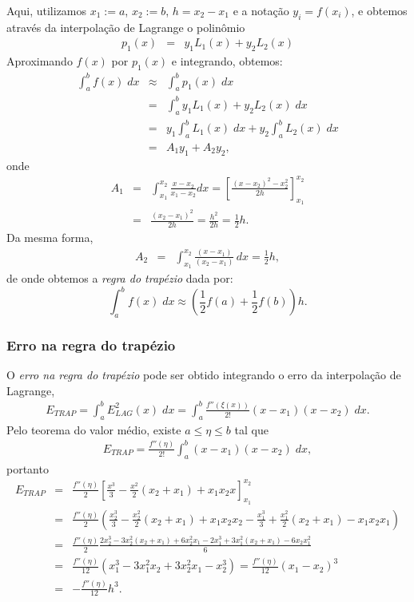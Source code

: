 Aqui, utilizamos $x_1:=a$,  $x_2:=b$, $h=x_2-x_1$ e a notação $y_i=f(x_i)$, e obtemos através da interpolação de Lagrange o polinômio
\begin{eqnarray}
p_1(x) &=& y_1 L_1(x)+ y_2 L_2(x)
\end{eqnarray}
Aproximando $f(x)$ por $p_1(x)$ e integrando, obtemos:
\begin{eqnarray}
  \int_a^bf(x)\;dx &\approx& \int_a^bp_1(x)\;dx \\
    &=& \int_a^b y_1L_1(x) + y_2L_2(x)\;dx \\
    &=& y_1 \int_a^b L_1(x)\;dx + y_2 \int_a^b L_2(x)\;dx \\
    &=& A_1 y_1 + A_2 y_2,
\end{eqnarray}
onde
\begin{eqnarray}
  A_1 &=& \int_{x_1}^{x_2}\frac{x-x_2}{x_1-x_2}dx =  \left[\frac{(x-x_2)^2-x_2^2}{2h}\right]_{x_1}^{x_2}\\
      &=& \frac{(x_2-x_1)^2}{2h} = \frac{h^2}{2h} = \frac{1}{2}h.
\end{eqnarray}
Da mesma forma,
\begin{eqnarray}
  A_2 &=& \int_{x_1}^{x_2}\frac{(x-x_1)}{(x_2-x_1)}\,dx = \frac{1}{2}h,
\end{eqnarray}
de onde obtemos a \emph{regra do trapézio} dada por:
\begin{equation}
  \int_a^b f(x)\;dx \approx \left(\frac{1}{2}f(a) + \frac{1}{2}f(b)\right)h.
\end{equation}


\subsubsection{Erro na regra do trapézio}
O \textit{erro na regra do trapézio} pode ser obtido integrando o erro da interpolação de Lagrange,
\begin{eqnarray}
   E_{TRAP} = \int_a^b E^2_{LAG}(x) \;dx= \int_a^b \frac{f''(\xi(x))}{2!}(x-x_1)(x-x_2) \;dx.
\end{eqnarray}
Pelo teorema do valor médio, existe $a\leq \eta\leq b$ tal que
\begin{eqnarray}
    E_{TRAP} = \frac{f''(\eta)}{2!}\int_a^b (x-x_1)(x-x_2) \;dx,
\end{eqnarray}
portanto
\begin{eqnarray}
     E_{TRAP}
  &=& \frac{f''(\eta)}{2}\left[\frac{x^3}{3}-\frac{x^2}{2}(x_2+x_1)+x_1x_2x\right]_{x_1}^{x_2}\\
  &=& \frac{f''(\eta)}{2}\left(\frac{x_2^3}{3}-\frac{x_2^2}{2}(x_2+x_1)+x_1x_2x_2-\frac{x_1^3}{3}+\frac{x_1^2}{2}(x_2+x_1)-x_1x_2x_1\right)\\
  &=& \frac{f''(\eta)}{2}\frac{2x_2^3-3x_2^2(x_2+x_1)+6x_2^2x_1-2x_1^3+3x_1^2(x_2+x_1)-6x_2x_1^2}{6}\\
  &=& \frac{f''(\eta)}{12}\left(x_1^3-3x_1^2x_2+3x_2^2x_1-x_2^3\right)
   =  \frac{f''(\eta)}{12}(x_1-x_2)^3\\
  &=& -\frac{f''(\eta)}{12}h^3.
\end{eqnarray}

